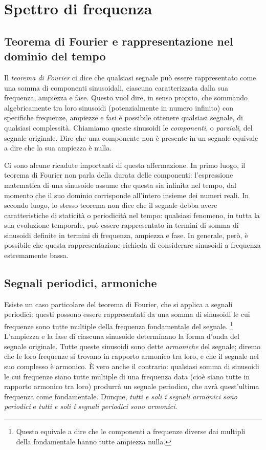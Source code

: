 \section{Spettro di frequenza}

\subsection{Teorema di Fourier e rappresentazione nel dominio del tempo}

Il \emph{teorema di Fourier} ci dice che qualsiasi segnale può essere rappresentato come una somma di componenti sinusoidali, ciascuna caratterizzata dalla sua frequenza, ampiezza e fase. Questo vuol dire, in senso proprio, che sommando algebricamente tra loro sinusoidi (potenzialmente in numero infinito) con specifiche frequenze, ampiezze e fasi è possibile ottenere qualsiasi segnale, di qualsiasi complessità. Chiamiamo queste sinusoidi le \emph{componenti}, o \emph{parziali}, del segnale originale. Dire che una componente non è presente in un segnale equivale a dire che la sua ampiezza è nulla.

Ci sono alcune ricadute importanti di questa affermazione. In primo luogo, il teorema di Fourier non parla della durata delle componenti: l'espressione matematica di una sinusoide assume che questa sia infinita nel tempo, dal momento che il suo dominio corrisponde all'intero insieme dei numeri reali. In secondo luogo, lo stesso teorema non dice che il segnale debba avere caratteristiche di staticità o periodicità nel tempo: qualsiasi fenomeno, in tutta la sua evoluzione temporale, può essere rappresentato in termini di somma di sinusoidi definite in termini di frequenza, ampiezza e fase. In generale, però, è possibile che questa rappresentazione richieda di considerare sinusoidi a frequenza estremamente bassa.


\subsection{Segnali periodici, armoniche}

Esiste un caso particolare del teorema di Fourier, che si applica a segnali periodici: questi possono essere rappresentati da una somma di sinusoidi le cui frequenze sono tutte multiple della frequenza fondamentale del segnale.%
\footnote{Questo equivale a dire che le componenti a frequenze diverse dai multipli della fondamentale hanno tutte ampiezza nulla.}
L'ampiezza e la fase di ciascuna sinusoide determinano la forma d'onda del segnale originale. Tutte queste sinusoidi sono dette \emph{armoniche} del segnale; diremo che le loro frequenze si trovano in rapporto armonico tra loro, e che il segnale nel suo complesso è armonico. È vero anche il contrario: qualsiasi somma di sinusoidi le cui frequenze siano tutte multiple di una frequenza data (cioè siano tutte in rapporto armonico tra loro) produrrà un segnale periodico, che avrà quest'ultima frequenza come fondamentale. Dunque, \emph{tutti e soli i segnali armonici sono periodici} e \emph{tutti e soli i segnali periodici sono armonici}.


